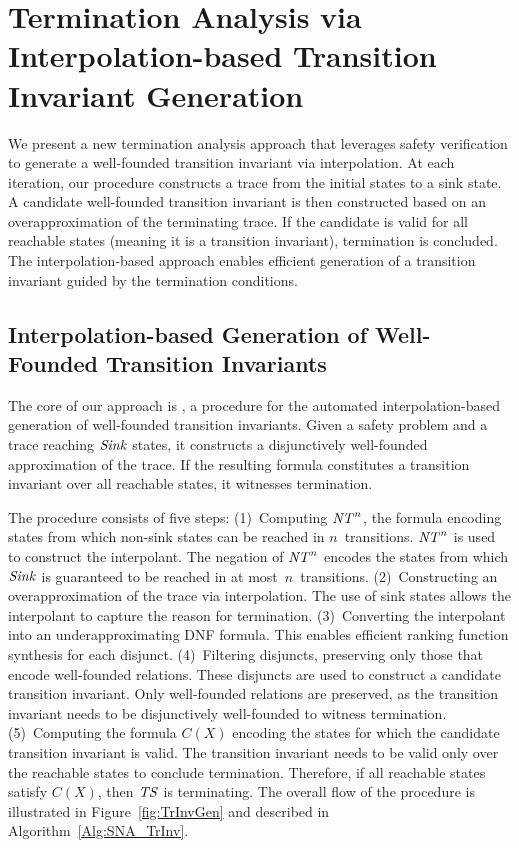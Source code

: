 \section{Termination Analysis via Interpolation-based Transition Invariant Generation}\label{Sec:Main}

We present a new termination analysis approach that leverages safety verification to generate a 
well-founded transition invariant via interpolation.
At each iteration, our procedure constructs a trace from the initial states to a sink state.
A candidate well-founded transition invariant is then constructed based on an overapproximation of the terminating trace.
If the candidate is valid for all reachable states (meaning it is a transition invariant), termination is concluded. 
The interpolation-based approach enables efficient generation of a transition invariant guided by the termination conditions.

\subsection{Interpolation-based Generation of Well-Founded Transition Invariants}

The core of our approach is \trInvSynthesis, a procedure for the automated 
interpolation-based generation of well-founded transition invariants.
Given a safety problem and a trace reaching $\mathit{Sink}$ states, %
it constructs a disjunctively well-founded approximation of the trace. 
If the resulting formula constitutes a transition invariant over all reachable states, 
it witnesses termination.

The procedure consists of five steps:
(1)~Computing $\mathit{NT}^n$, the formula encoding states from which non-sink states
can be reached in $n$~transitions.
$\mathit{NT}^n$ is used to construct the interpolant. 
The negation of $\mathit{NT}^n$ encodes the states from which $\mathit{Sink}$ is guaranteed to be reached in at most~$n$~transitions.
(2)~Constructing an overapproximation of the trace via interpolation.
The use of sink states allows the interpolant to capture the reason for termination.
(3)~Converting the interpolant into an underapproximating DNF formula.
This enables efficient ranking function synthesis for each disjunct.
(4)~Filtering disjuncts, preserving only those that encode well-founded relations. These disjuncts are used to construct a candidate transition invariant.
Only well-founded relations are preserved, as the transition invariant needs to be disjunctively well-founded to witness termination.
(5)~Computing the formula $C(X)$ encoding the states for which the candidate transition invariant is valid.
The transition invariant needs to be valid only over the reachable states to conclude termination.
Therefore, if all reachable states satisfy $C(X)$, then $\mathit{TS}$ is terminating.
The overall flow of the procedure is illustrated in Figure~\ref{fig:TrInvGen} and described in Algorithm~\ref{Alg:SNA_TrInv}.

